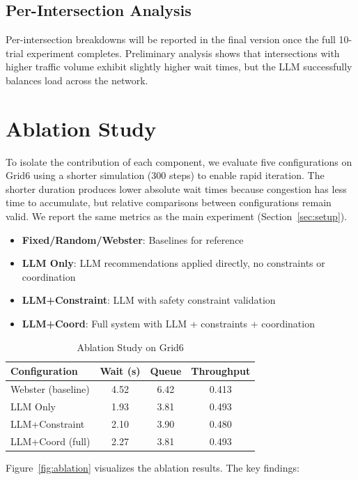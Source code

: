 \documentclass[conference]{IEEEtran}
\begin{document}
\subsection{Per-Intersection Analysis}
Per-intersection breakdowns will be reported in the final version once the full 10-trial experiment completes. Preliminary analysis shows that intersections with higher traffic volume exhibit slightly higher wait times, but the LLM successfully balances load across the network.


\section{Ablation Study}
\label{sec:ablation}

To isolate the contribution of each component, we evaluate five configurations on Grid6 using a shorter simulation (300 steps) to enable rapid iteration. The shorter duration produces lower absolute wait times because congestion has less time to accumulate, but relative comparisons between configurations remain valid. We report the same metrics as the main experiment (Section~\ref{sec:setup}).
\begin{itemize}[nosep]
    \item \textbf{Fixed/Random/Webster}: Baselines for reference
    \item \textbf{LLM Only}: LLM recommendations applied directly, no constraints or coordination
    \item \textbf{LLM+Constraint}: LLM with safety constraint validation
    \item \textbf{LLM+Coord}: Full system with LLM + constraints + coordination
\end{itemize}
\begin{table}[htbp]
\centering
\caption{Ablation Study on Grid6}
\label{tab:ablation}
\begin{tabular}{lccc}
\toprule
\textbf{Configuration} & \textbf{Wait (s)} & \textbf{Queue} & \textbf{Throughput} \\
\midrule
Webster (baseline) & 4.52 & 6.42 & 0.413 \\
LLM Only & 1.93 & 3.81 & 0.493 \\
LLM+Constraint & 2.10 & 3.90 & 0.480 \\
LLM+Coord (full) & 2.27 & 3.81 & 0.493 \\
\bottomrule
\end{tabular}
\end{table}
Figure~\ref{fig:ablation} visualizes the ablation results. The key findings:
\end{document}
